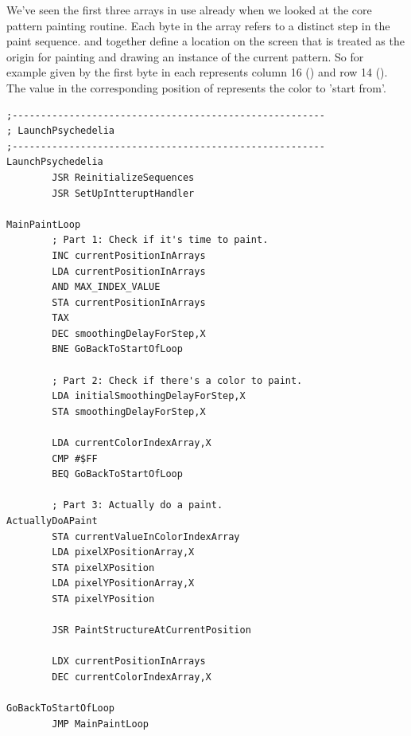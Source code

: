 We've seen the first three arrays in use already when we looked at the core
pattern painting routine. Each byte in the array refers to a distinct step in the paint sequence.
 and  together define a location on the screen
that is treated as the origin for painting and drawing an instance of the current pattern. So for example  given by the
first byte in each represents column 16 () and row 14 (). The value in
the corresponding position of  represents the color to 'start from'.


\clearpage
\begin{lstlisting}
;-------------------------------------------------------
; LaunchPsychedelia
;-------------------------------------------------------
LaunchPsychedelia   
        JSR ReinitializeSequences
        JSR SetUpIntteruptHandler

MainPaintLoop   
        ; Part 1: Check if it's time to paint.
        INC currentPositionInArrays
        LDA currentPositionInArrays
        AND MAX_INDEX_VALUE
        STA currentPositionInArrays
        TAX 
        DEC smoothingDelayForStep,X
        BNE GoBackToStartOfLoop

        ; Part 2: Check if there's a color to paint.
        LDA initialSmoothingDelayForStep,X
        STA smoothingDelayForStep,X

        LDA currentColorIndexArray,X
        CMP #$FF
        BEQ GoBackToStartOfLoop

        ; Part 3: Actually do a paint.
ActuallyDoAPaint
        STA currentValueInColorIndexArray
        LDA pixelXPositionArray,X
        STA pixelXPosition
        LDA pixelYPositionArray,X
        STA pixelYPosition

        JSR PaintStructureAtCurrentPosition

        LDX currentPositionInArrays
        DEC currentColorIndexArray,X

GoBackToStartOfLoop   
        JMP MainPaintLoop

\end{lstlisting}

